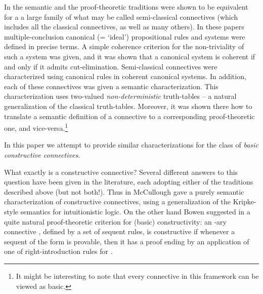 \documentclass{LMCS}
\theoremstyle{remark}
\begin{document}
In \cite{AL05} the semantic and the proof-theoretic traditions were shown to be equivalent
for a a large family of what may be called semi-classical connectives 
(which includes all the classical connectives, as well as many others).
In these papers multiple-conclusion
canonical (= `ideal') propositional rules and systems were defined in precise terms.
A simple coherence criterion for the non-triviality of such a system was given,
and it was shown that a canonical system 
is coherent if and only if it admits cut-elimination.
Semi-classical connectives were characterized using canonical rules in coherent canonical systems.
In addition, each of these connectives was given  
a semantic characterization. This characterization uses  
two-valued {\em non-deterministic} truth-tables -- a
natural generalization of the classical truth-tables. 
Moreover, it was shown there how to translate a semantic definition of a connective 
to a corresponding proof-theoretic one, and vice-versa.\footnote{It might be interesting to note that 
every connective in this framework can be viewed as basic.}



In this paper we attempt to provide similar 
characterizations for the class of {\em basic constructive connectives}. 

What exactly is a constructive connective? Several different answers
to this question have been given in the literature,
each adopting either of the traditions described above
(but not both!). 
Thus in \cite{McCullough} McCullough
gave a purely semantic characterization of constructive connectives,
using a generalization of the Kripke-style semantics for intuitionistic logic.
On the other hand Bowen suggested in \cite{Bowen} 
a quite natural proof-theoretic criterion for (basic)
constructivity:  an -ary connective , 
defined by a set of sequent rules, is constructive if
whenever a sequent of the form  is provable, 
then it has a proof ending by an application of one 
of right-introduction rules for .
\end{document}
